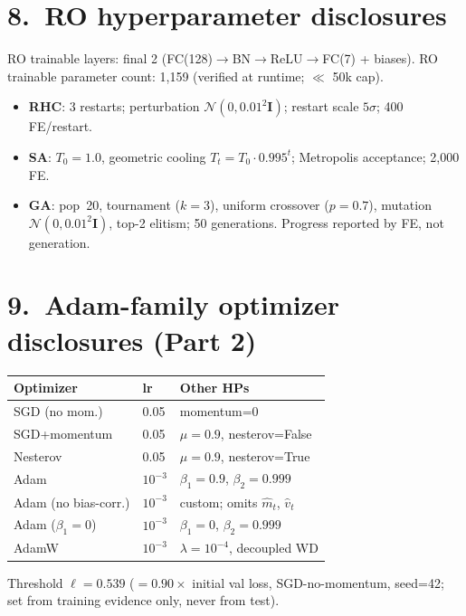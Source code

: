 \documentclass[11pt]{article}
\begin{document}
\section*{8.\ RO hyperparameter disclosures}
RO trainable layers: final 2 (FC(128)$\to$BN$\to$ReLU$\to$FC(7) + biases).
RO trainable parameter count: 1{,}159 (verified at runtime; $\ll$ 50k cap).

\begin{itemize}[leftmargin=*,nosep]
  \item \textbf{RHC}: 3 restarts; perturbation $\mathcal{N}(0,0.01^2\mathbf{I})$;
        restart scale $5\sigma$; 400 FE/restart.
  \item \textbf{SA}: $T_0{=}1.0$, geometric cooling $T_t{=}T_0 \cdot 0.995^t$;
        Metropolis acceptance; 2{,}000 FE.
  \item \textbf{GA}: pop~20, tournament ($k{=}3$), uniform crossover
        ($p{=}0.7$), mutation $\mathcal{N}(0,0.01^2\mathbf{I})$,
        top-2 elitism; 50 generations. Progress reported by FE, not generation.
\end{itemize}

\section*{9.\ Adam-family optimizer disclosures (Part 2)}
\begin{center}
\begin{tabular}{lll}
\toprule
\textbf{Optimizer} & \textbf{lr} & \textbf{Other HPs} \\
\midrule
SGD (no mom.) & 0.05 & momentum=0 \\
SGD+momentum  & 0.05 & $\mu{=}0.9$, nesterov=False \\
Nesterov      & 0.05 & $\mu{=}0.9$, nesterov=True \\
Adam          & $10^{-3}$ & $\beta_1{=}0.9$, $\beta_2{=}0.999$ \\
Adam (no bias-corr.) & $10^{-3}$ & custom; omits $\hat{m}_t$, $\hat{v}_t$ \\
Adam ($\beta_1{=}0$) & $10^{-3}$ & $\beta_1{=}0$, $\beta_2{=}0.999$ \\
AdamW         & $10^{-3}$ & $\lambda{=}10^{-4}$, decoupled WD \\
\bottomrule
\end{tabular}
\end{center}
Threshold $\ell{=}0.539$ ($=0.90\times$ initial val loss, SGD-no-momentum, seed=42;
set from training evidence only, never from test).
\end{document}
